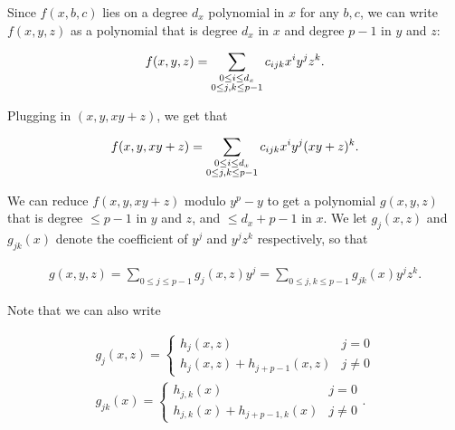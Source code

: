 Since $f(x,b,c)$ lies on a degree $d_{x}$ polynomial in $x$ for any $b,c$, we can write $f(x,y,z)$ as a polynomial that is degree $d_{x}$ in $x$ and degree $p-1$ in $y$ and $z$:\par


\[\begin{gathered}
f(x,y,z)=\sum_{\begin{subarray}{c}0\leq i\leq d_{x}\\
0\leq j,k\leq p-1\end{subarray}}c_{ijk}x^{i}y^{j}z^{k}.
\end{gathered}\]




Plugging in $(x,y,xy+z)$, we get that\par


\[\begin{gathered}
f(x,y,xy+z)=\sum_{\begin{subarray}{c}0\leq i\leq d_{x}\\
0\leq j,k\leq p-1\end{subarray}}c_{ijk}x^{i}y^{j}(xy+z)^{k}.
\end{gathered}\]


We can reduce $f(x,y,xy+z)$ modulo $y^{p}-y$ to get a polynomial $g(x,y,z)$ that is degree $\leq p-1$ in $y$ and $z$, and $\leq d_{x}+p-1$ in $x$. We let $g_{j}(x,z)$ and $g_{jk}(x)$ denote the coefficient of $y^{j}$ and $y^{j}z^{k}$ respectively, so that\par


\[\begin{gathered}
g(x,y,z)=\sum_{0\leq j\leq p-1}g_{j}(x,z)y^{j}=\sum_{0\leq j,k\leq p-1}g_{jk}(x)y^{j}z^{k}.
\end{gathered}\]


Note that we can also write\par


\[\begin{gathered}
\displaystyle g_{j}(x,z) \displaystyle=\begin{cases}h_{j}(x,z)&j=0\\
h_{j}(x,z)+h_{j+p-1}(x,z)&j\not=0\end{cases} \\
\displaystyle g_{jk}(x) \displaystyle=\begin{cases}h_{j,k}(x)&j=0\\
h_{j,k}(x)+h_{j+p-1,k}(x)&j\not=0\end{cases}.
\end{gathered}\]




